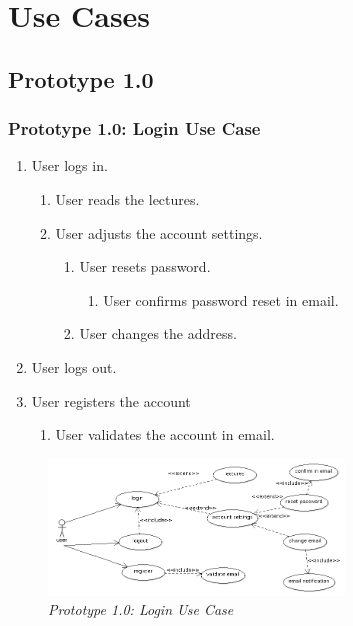 \documentclass[12pt,twoside,a4paper]{report}
\begin{document}
\section{Use Cases}\label{3.5}
\subsection{Prototype 1.0}\label{3.5.1}
\subsubsection{Prototype 1.0: Login Use Case}\label{3.5.1.1}

\begin{enumerate}
\item User logs in.
    \begin{enumerate}
    \item User reads the lectures.
    \item User adjusts the account settings.
     	\begin{enumerate}
     	\item User resets password.
     		\begin{enumerate}
     		\item User confirms password reset in email.
     		\end{enumerate}
     	\item User changes the address.
     	\end{enumerate}
   \end{enumerate}
\item User logs out.
\item User registers the account
   	\begin{enumerate}
    \item User validates the account in email.
   	\end{enumerate}
\end{enumerate}

\begin{figure}[!ht]
	\centering
		\includegraphics[width=0.7\textwidth, totalheight=5cm]{login_use_case}
	\caption{\textit{Prototype 1.0: Login Use Case}}
	\label{f3.5.1.1}
\end{figure}
\end{document}
